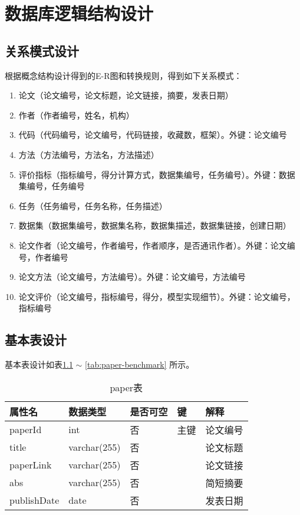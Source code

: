 \chapter{数据库逻辑结构设计}

\section{关系模式设计}

根据概念结构设计得到的E-R图和转换规则，得到如下关系模式：
\begin{enumerate}
    \item 论文（论文编号，论文标题，论文链接，摘要，发表日期）
    \item 作者（作者编号，姓名，机构）
    \item 代码（代码编号，论文编号，代码链接，收藏数，框架）。外键：论文编号
    \item 方法（方法编号，方法名，方法描述）
    \item 评价指标（指标编号，得分计算方式，数据集编号，任务编号）。外键：数据集编号，任务编号
    \item 任务（任务编号，任务名称，任务描述）
    \item 数据集（数据集编号，数据集名称，数据集描述，数据集链接，创建日期）
    \item 论文作者（论文编号，作者编号，作者顺序，是否通讯作者）。外键：论文编号，作者编号
    \item 论文方法（论文编号，方法编号）。外键：论文编号，方法编号
    \item  论文评价（论文编号，指标编号，得分，模型实现细节）。外键：论文编号，指标编号
\end{enumerate}

\section{基本表设计}

基本表设计如表\ref{tab:paper} $\sim$ \ref{tab:paper-benchmark} 所示。

\begin{table}[htbp!]
    \centering
    \caption{paper表}
    \begin{tabular}{|l|l|l|l|l|}
    \hline
        属性名 & 数据类型 & 是否可空 & 键 & 解释 \\ \hline
        paperId & int & 否 & 主键 & 论文编号 \\ \hline
        title & varchar(255) & 否 &  & 论文标题 \\ \hline
        paperLink & varchar(255) & 否 &  & 论文链接 \\ \hline
        abs & varchar(255) & 否 &  & 简短摘要 \\ \hline
        publishDate & date & 否 &  & 发表日期 \\ \hline
    \end{tabular}
    \label{tab:paper}
\end{table}

